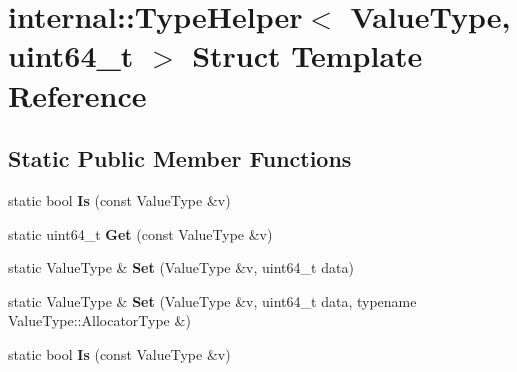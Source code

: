 \hypertarget{structinternal_1_1_type_helper_3_01_value_type_00_01uint64__t_01_4}{}\section{internal\+:\+:Type\+Helper$<$ Value\+Type, uint64\+\_\+t $>$ Struct Template Reference}
\label{structinternal_1_1_type_helper_3_01_value_type_00_01uint64__t_01_4}
\subsection*{Static Public Member Functions}
\begin{DoxyCompactItemize}
\item 
static bool {\bfseries Is} (const Value\+Type \&v)\hypertarget{structinternal_1_1_type_helper_3_01_value_type_00_01uint64__t_01_4_a4916651732ed27fa944c96a32cec5b88}{}\label{structinternal_1_1_type_helper_3_01_value_type_00_01uint64__t_01_4_a4916651732ed27fa944c96a32cec5b88}

\item 
static uint64\+\_\+t {\bfseries Get} (const Value\+Type \&v)\hypertarget{structinternal_1_1_type_helper_3_01_value_type_00_01uint64__t_01_4_a1b1b2e4fe3c38fb37701284c6571ee92}{}\label{structinternal_1_1_type_helper_3_01_value_type_00_01uint64__t_01_4_a1b1b2e4fe3c38fb37701284c6571ee92}

\item 
static Value\+Type \& {\bfseries Set} (Value\+Type \&v, uint64\+\_\+t data)\hypertarget{structinternal_1_1_type_helper_3_01_value_type_00_01uint64__t_01_4_a38392035fe5a647078b24f0e15a84145}{}\label{structinternal_1_1_type_helper_3_01_value_type_00_01uint64__t_01_4_a38392035fe5a647078b24f0e15a84145}

\item 
static Value\+Type \& {\bfseries Set} (Value\+Type \&v, uint64\+\_\+t data, typename Value\+Type\+::\+Allocator\+Type \&)\hypertarget{structinternal_1_1_type_helper_3_01_value_type_00_01uint64__t_01_4_a3c8b01c3e9a9e63c99bef2db9fdf3823}{}\label{structinternal_1_1_type_helper_3_01_value_type_00_01uint64__t_01_4_a3c8b01c3e9a9e63c99bef2db9fdf3823}

\item 
static bool {\bfseries Is} (const Value\+Type \&v)\hypertarget{structinternal_1_1_type_helper_3_01_value_type_00_01uint64__t_01_4_a4916651732ed27fa944c96a32cec5b88}{}\label{structinternal_1_1_type_helper_3_01_value_type_00_01uint64__t_01_4_a4916651732ed27fa944c96a32cec5b88}


\end{DoxyCompactItemize}
